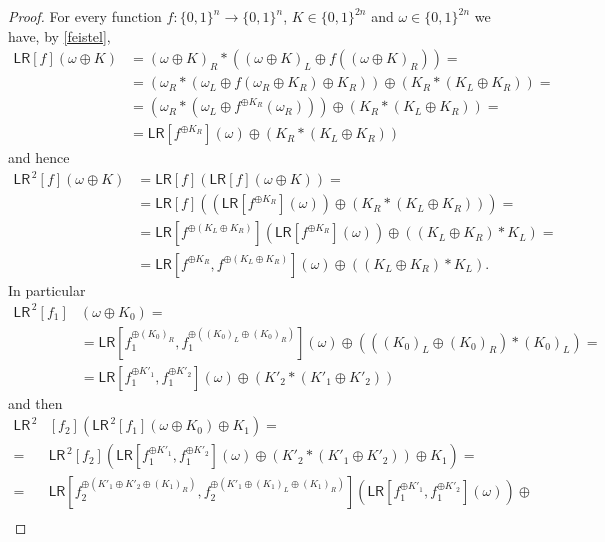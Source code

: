 \documentclass{llncs}
\newcommand{\s}{\{0,1\}}
\newcommand{\tx}{\textsf}
\begin{document}
\begin{proof}
 For every function $f:\s^n\to\s^n$, $K\in\s^{2n}$ and $\omega\in\s^{2n}$ we have, by \eqref{feistel},
\begin{align*}
\tx{LR}[f](\omega\oplus K)&=(\omega\oplus K)_R*\left((\omega\oplus K)_L\oplus f((\omega\oplus K)_R)\right)=\\
&=\left(\omega_R*\left(\omega_L\oplus f(\omega_R\oplus K_R)\oplus K_R\right)\right)\oplus\left(K_R*(K_L\oplus K_R)\right)=\\
&=\left(\omega_R*\left(\omega_L\oplus f^{\oplus K_R}(\omega_R)\right)\right)\oplus\left(K_R*(K_L\oplus K_R)\right)=\\
&=\tx{LR}\left[f^{\oplus K_R}\right](\omega)\oplus\left(K_R*(K_L\oplus K_R)\right)
\end{align*}
and hence
\begin{align*}
\tx{LR}^{\,2}[f](\omega\oplus K)&=\tx{LR}[f]\left(\tx{LR}[f](\omega\oplus K)\right)=\\
&=\tx{LR}[f]\left(\left(\tx{LR}\left[f^{\oplus K_R}\right](\omega)\right)\oplus\left(K_R*(K_L\oplus K_R)\right)\right)=\\
&=\tx{LR}\left[f^{\oplus (K_L\oplus K_R)}\right]\left(\tx{LR}\left[f^{\oplus K_R}\right](\omega)\right)\oplus\left((K_L\oplus K_R)*K_L\right)=\\
&=\tx{LR}\left[f^{\oplus K_R},f^{\oplus (K_L\oplus K_R)}\right](\omega)\oplus\left((K_L\oplus K_R)*K_L\right).
\end{align*}
In particular
\begin{align*}
\tx{LR}^{\,2}[f_1]&(\omega \oplus K_0)=\\
&=\tx{LR}\left[f_1^{\oplus (K_0)_R},f_1^{\oplus \left((K_0)_L\oplus (K_0)_R\right)}\right](\omega)\oplus\left(((K_0)_L\oplus (K_0)_R)*(K_0)_L\right)=\\
&=\tx{LR}\left[f_1^{\oplus K'_1},f_1^{\oplus K'_2}\right](\omega)\oplus\left(K'_2*(K'_1\oplus K'_2)\right)
\end{align*}
and then
\begin{align*}
\tx{LR}^{\,2}&[f_2]\left(\tx{LR}^{\,2}[f_1](\omega \oplus K_0)\oplus K_1\right)=\\
=&\tx{LR}^{\,2}[f_2]\left(\tx{LR}\left[f_1^{\oplus K'_1},f_1^{\oplus K'_2}\right](\omega)\oplus\left(K'_2*(K'_1\oplus K'_2)\right)\oplus K_1\right)=\\
=&\tx{LR}\left[f_2^{\oplus \left(K'_1\oplus K'_2\oplus(K_1)_R\right)},f_2^{\oplus \left(K'_1\oplus(K_1)_L\oplus(K_1)_R\right)}\right]\left(\tx{LR}\left[f_1^{\oplus K'_1},f_1^{\oplus K'_2}\right](\omega)\right)\oplus\\

\end{align*}
\end{proof}
\end{document}
